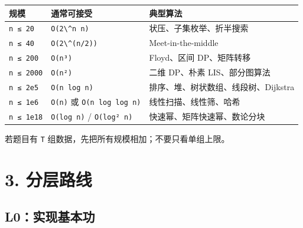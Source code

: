 \begin{longtable}[]{@{}
  >{\raggedright\arraybackslash}p{}
  >{\raggedright\arraybackslash}p{}
  >{\raggedright\arraybackslash}p{}@{}}
\toprule\noalign{}
\begin{minipage}[b]{\linewidth}\raggedright
规模
\end{minipage} & \begin{minipage}[b]{\linewidth}\raggedright
通常可接受
\end{minipage} & \begin{minipage}[b]{\linewidth}\raggedright
典型算法
\end{minipage} \\
\midrule\noalign{}
\endhead
\bottomrule\noalign{}
\endlastfoot
\passthrough{\lstinline!n ≤ 20!} & \passthrough{\lstinline!O(2\^n n)!} & 状压、子集枚举、折半搜索 \\
\passthrough{\lstinline!n ≤ 40!} & \passthrough{\lstinline!O(2\^(n/2))!} & Meet-in-the-middle \\
\passthrough{\lstinline!n ≤ 200!} & \passthrough{\lstinline!O(n³)!} & Floyd、区间 DP、矩阵转移 \\
\passthrough{\lstinline!n ≤ 2000!} & \passthrough{\lstinline!O(n²)!} & 二维 DP、朴素 LIS、部分图算法 \\
\passthrough{\lstinline!n ≤ 2e5!} & \passthrough{\lstinline!O(n log n)!} & 排序、堆、树状数组、线段树、Dijkstra \\
\passthrough{\lstinline!n ≤ 1e6!} & \passthrough{\lstinline!O(n)!} 或 \passthrough{\lstinline!O(n log log n)!} & 线性扫描、线性筛、哈希 \\
\passthrough{\lstinline!n ≤ 1e18!} & \passthrough{\lstinline!O(log n)!} / \passthrough{\lstinline!O(log² n)!} & 快速幂、矩阵快速幂、数论分块 \\
\end{longtable}

若题目有 \passthrough{\lstinline!T!} 组数据，先把所有规模相加；不要只看单组上限。

\section{3. 分层路线}\label{ux5206ux5c42ux8defux7ebf}

\subsection{L0：实现基本功}\label{l0ux5b9eux73b0ux57faux672cux529f}

